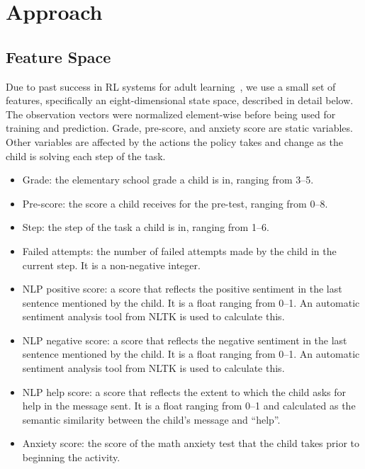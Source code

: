 \documentclass[sn-mathphys,Numbered]{sn-jnl}%
\theoremstyle{thmstyleone}%
\theoremstyle{thmstyletwo}%
\theoremstyle{thmstylethree}%
\begin{document}
\section{Approach}

\subsection{Feature Space}

Due to past success in RL systems for adult learning~\cite{chi2011empirically,bassen2020reinforcement}, we use a small set of features, specifically 
an eight-dimensional state space, described in detail below. The observation vectors were normalized element-wise before being used for training and prediction. 
Grade, pre-score, and anxiety score are static variables. Other variables are affected by the actions the policy takes and change as the child is solving each step of the task. 

 \begin{itemize}
 \setlength{\itemindent}{.2in}
     \item Grade: the elementary school grade a child is in, ranging from 3--5. 
     \item Pre-score: the score a child receives for the pre-test, ranging from 0--8.
     \item Step: the step of the task a child is in, ranging from 1--6.
     \item Failed attempts: the number of failed attempts made by the child in the current step. It is a non-negative integer.
     \item NLP positive score: a score that reflects the positive sentiment in the last sentence mentioned by the child. It is a float ranging from 0--1. An automatic sentiment analysis tool from NLTK \cite{nltk} is used to calculate this.
     \item NLP negative score: a score that reflects the negative sentiment in the last sentence mentioned by the child. It is a float ranging from 0--1. An automatic sentiment analysis tool from NLTK \cite{nltk} is used to calculate this.
     \item NLP help score: a score that reflects the extent to which the child asks for help in the message sent. It is a float ranging from 0--1 and calculated as the semantic similarity between the child's message and ``help''.
     \item Anxiety score: the score of the math anxiety test \cite{math_anxiety} that the child takes prior to beginning the activity.
 \end{itemize}
 
\end{document}
